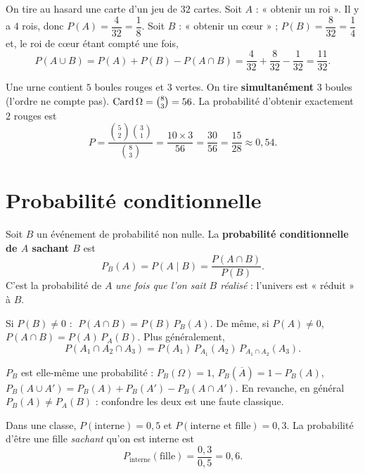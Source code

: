 \begin{exemple}
On tire au hasard une carte d'un jeu de $32$ cartes. Soit $A$ : « obtenir un
roi ». Il y a $4$ rois, donc $P(A)=\dfrac{4}{32}=\dfrac18$. Soit $B$ : « obtenir
un c\oe ur » ; $P(B)=\dfrac{8}{32}=\dfrac14$ et, le roi de c\oe ur étant compté
une fois,
\[
P(A\cup B)=P(A)+P(B)-P(A\cap B)=\dfrac{4}{32}+\dfrac{8}{32}-\dfrac{1}{32}=\dfrac{11}{32}.
\]
\end{exemple}

\begin{exemple}
Une urne contient $5$ boules rouges et $3$ vertes. On tire \textbf{simultanément}
$3$ boules (l'ordre ne compte pas). $\operatorname{Card}\Omega=\binom83=56$. La probabilité
d'obtenir exactement $2$ rouges est
\[
P=\frac{\binom52\binom31}{\binom83}=\frac{10\times3}{56}=\frac{30}{56}=\frac{15}{28}\approx0{,}54.
\]
\end{exemple}

\section{Probabilité conditionnelle}

\begin{definition}
Soit $B$ un événement de probabilité non nulle. La \textbf{probabilité
conditionnelle de $A$ sachant $B$} est
\[
P_B(A)=P(A\mid B)=\frac{P(A\cap B)}{P(B)}.
\]
C'est la probabilité de $A$ \emph{une fois que l'on sait $B$ réalisé} : l'univers
est « réduit » à $B$.
\end{definition}

\begin{propriete}
Si $P(B)\neq 0$ : $\;P(A\cap B)=P(B)\,P_B(A)$. De même, si $P(A)\neq 0$,
$P(A\cap B)=P(A)\,P_A(B)$. Plus généralement,
\[
P(A_1\cap A_2\cap A_3)=P(A_1)\,P_{A_1}(A_2)\,P_{A_1\cap A_2}(A_3).
\]
\end{propriete}

\begin{remarque}
$P_B$ est elle-même une probabilité : $P_B(\Omega)=1$, $P_B(\overline A)=1-P_B(A)$,
$P_B(A\cup A')=P_B(A)+P_B(A')-P_B(A\cap A')$. En revanche, en général
$P_B(A)\ne P_A(B)$ : confondre les deux est une faute classique.
\end{remarque}

\begin{exemple}
Dans une classe, $P(\text{interne})=0{,}5$ et $P(\text{interne et fille})=0{,}3$.
La probabilité d'être une fille \emph{sachant} qu'on est interne est
\[
P_{\text{interne}}(\text{fille})=\frac{0{,}3}{0{,}5}=0{,}6.
\]
\end{exemple}

